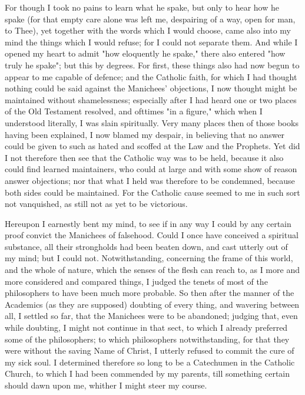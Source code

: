 \documentclass[b5paper,openright,12pt,twoside]{book}
\begin{document}
For though I took no pains to learn what he spake, but only to hear how
he spake (for that empty care alone was left me, despairing of a way,
open for man, to Thee), yet together with the words which I would
choose, came also into my mind the things which I would refuse; for
I could not separate them. And while I opened my heart to admit "how
eloquently he spake," there also entered "how truly he spake"; but this
by degrees. For first, these things also had now begun to appear to
me capable of defence; and the Catholic faith, for which I had thought
nothing could be said against the Manichees' objections, I now thought
might be maintained without shamelessness; especially after I had heard
one or two places of the Old Testament resolved, and ofttimes "in a
figure," which when I understood literally, I was slain spiritually.
Very many places then of those books having been explained, I now blamed
my despair, in believing that no answer could be given to such as hated
and scoffed at the Law and the Prophets. Yet did I not therefore then
see that the Catholic way was to be held, because it also could find
learned maintainers, who could at large and with some show of reason
answer objections; nor that what I held was therefore to be condemned,
because both sides could be maintained. For the Catholic cause seemed to
me in such sort not vanquished, as still not as yet to be victorious.

Hereupon I earnestly bent my mind, to see if in any way I could by any
certain proof convict the Manichees of falsehood. Could I once have
conceived a spiritual substance, all their strongholds had been beaten
down, and cast utterly out of my mind; but I could not. Notwithstanding,
concerning the frame of this world, and the whole of nature, which the
senses of the flesh can reach to, as I more and more considered and
compared things, I judged the tenets of most of the philosophers to have
been much more probable. So then after the manner of the Academics (as
they are supposed) doubting of every thing, and wavering between all, I
settled so far, that the Manichees were to be abandoned; judging that,
even while doubting, I might not continue in that sect, to which I
already preferred some of the philosophers; to which philosophers
notwithstanding, for that they were without the saving Name of Christ,
I utterly refused to commit the cure of my sick soul. I determined
therefore so long to be a Catechumen in the Catholic Church, to which
I had been commended by my parents, till something certain should dawn
upon me, whither I might steer my course.
\end{document}
